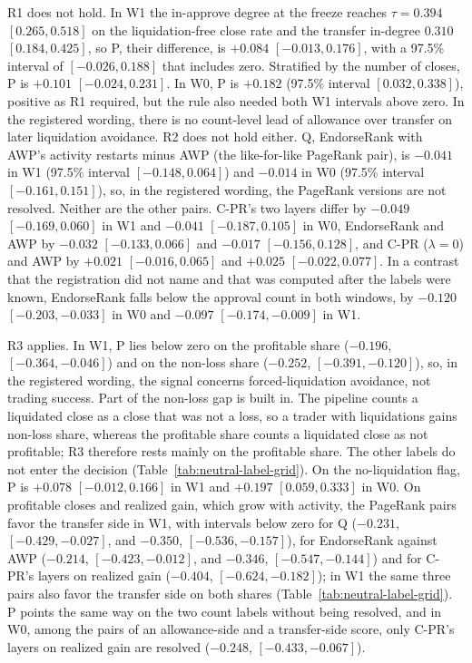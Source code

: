 

R1 does not hold. In W1 the in-approve degree at the freeze reaches $\tau=0.394$ $[0.265,0.518]$ on the liquidation-free close rate and the transfer in-degree $0.310$ $[0.184,0.425]$, so P, their difference, is $+0.084$ $[-0.013,0.176]$, with a 97.5\% interval of $[-0.026,0.188]$ that includes zero. Stratified by the number of closes, P is $+0.101$ $[-0.024,0.231]$. In W0, P is $+0.182$ (97.5\% interval $[0.032,0.338]$), positive as R1 required, but the rule also needed both W1 intervals above zero. In the registered wording, there is no count-level lead of allowance over transfer on later liquidation avoidance. R2 does not hold either. Q, EndorseRank with AWP's activity restarts minus AWP (the like-for-like PageRank pair), is $-0.041$ in W1 (97.5\% interval $[-0.148,0.064]$) and $-0.014$ in W0 (97.5\% interval $[-0.161,0.151]$), so, in the registered wording, the PageRank versions are not resolved. Neither are the other pairs. C-PR's two layers differ by $-0.049$ $[-0.169,0.060]$ in W1 and $-0.041$ $[-0.187,0.105]$ in W0, EndorseRank and AWP by $-0.032$ $[-0.133,0.066]$ and $-0.017$ $[-0.156,0.128]$, and C-PR ($\lambda=0$) and AWP by $+0.021$ $[-0.016,0.065]$ and $+0.025$ $[-0.022,0.077]$. In a contrast that the registration did not name and that was computed after the labels were known, EndorseRank falls below the approval count in both windows, by $-0.120$ $[-0.203,-0.033]$ in W0 and $-0.097$ $[-0.174,-0.009]$ in W1.

R3 applies. In W1, P lies below zero on the profitable share ($-0.196$, $[-0.364,-0.046]$) and on the non-loss share ($-0.252$, $[-0.391,-0.120]$), so, in the registered wording, the signal concerns forced-liquidation avoidance, not trading success. Part of the non-loss gap is built in. The pipeline counts a liquidated close as a close that was not a loss, so a trader with liquidations gains non-loss share, whereas the profitable share counts a liquidated close as not profitable; R3 therefore rests mainly on the profitable share. The other labels do not enter the decision (Table~\ref{tab:neutral-label-grid}). On the no-liquidation flag, P is $+0.078$ $[-0.012,0.166]$ in W1 and $+0.197$ $[0.059,0.333]$ in W0. On profitable closes and realized gain, which grow with activity, the PageRank pairs favor the transfer side in W1, with intervals below zero for Q ($-0.231$, $[-0.429,-0.027]$, and $-0.350$, $[-0.536,-0.157]$), for EndorseRank against AWP ($-0.214$, $[-0.423,-0.012]$, and $-0.346$, $[-0.547,-0.144]$) and for C-PR's layers on realized gain ($-0.404$, $[-0.624,-0.182]$); in W1 the same three pairs also favor the transfer side on both shares (Table~\ref{tab:neutral-label-grid}). P points the same way on the two count labels without being resolved, and in W0, among the pairs of an allowance-side and a transfer-side score, only C-PR's layers on realized gain are resolved ($-0.248$, $[-0.433,-0.067]$).

